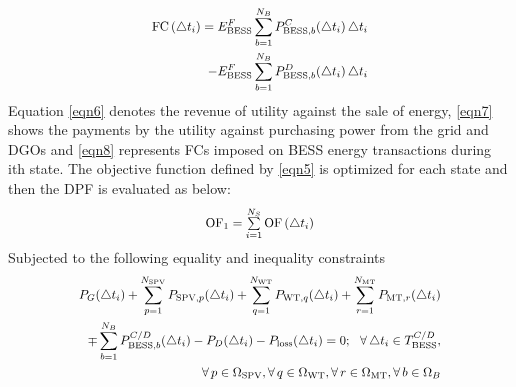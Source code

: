 \documentclass[journal]{IEEEtran}
\newcommand*\Laplace{\mathop{}\!\mathbin\bigtriangleup}
\begin{document}
    \begin{equation}
        \scalebox{0.9}[0.9]{$
    \begin{split}
 \text{FC}\left( \Laplace {{t}_{i}} \right)= E_{\text{BESS}}^{F}\sum\limits_{b=1}^{{{N}_{B}}}{P_{\text{BESS},b}^{C}(\Laplace {{t}_{i}})\Laplace {{t}_{i}}}\\
 -E_{\text{BESS}}^{F} \sum\limits_{b=1}^{{{N}_{B}}}{P_{\text{BESS},b}^{D}(\Laplace {{t}_{i}})\Laplace {{t}_{i}}} 
    \end{split}
    $}
    \label{eqn8}
    \end{equation}
    Equation \eqref{eqn6} denotes the revenue of utility against the sale of energy, \eqref{eqn7} shows the payments by the utility against purchasing power from the grid and DGOs and \eqref{eqn8} represents FCs imposed on BESS energy transactions during ith state. The objective function defined by \eqref{eqn5} is optimized for each state and then the DPF is evaluated as below: 
    \begin{equation}
        \scalebox{0.9}[0.9]{$
    \text{O{F}}_{1}=\sum\limits_{i=1}^{{{N}_{S}}}{\text{OF}\left( \Laplace {{t}_{i}} \right)}
    $}
    \label{eqn9}
    \end{equation}
    Subjected to the following equality and inequality constraints 
    \begin{equation}
\scalebox{0.9}[0.9]{$
    \begin{split}
{{P}_{G}}(\Laplace {{t}_{i}})+\sum\limits_{p=1}^{{{N}_{\text{SPV}}}}{{{P}_{\text{SPV},p}}(\Laplace {{t}_{i}})}+\sum\limits_{q=1}^{{{N}_{\text{WT}}}}{{{P}_{\text{WT},q}}(\Laplace {{t}_{i}})}
+\sum\limits_{r=1}^{{{N}_{\text{MT}}}}{{{P}_{\text{MT},r}}(\Laplace {{t}_{i}})}\\
\mp \sum\limits_{b=1}^{{{N}_{B}}}{P_{{\text{BESS}},b}^{C/D}(\Laplace {{t}_{i}})}
-{{P}_{D}}(\Laplace {{t}_{i}})-{{P}_{\text{loss}}}(\Laplace {{t}_{i}}) =0;
~~\forall \Laplace {{t}_{i}}\in T_{\text{BESS}}^{C/D},\\ 
\forall \,p\in {{\Omega }_{\text{SPV}}},\forall \,q\in {{\Omega}_{\text{WT}}},\forall \,r\in {{\Omega }_{\text{MT}}},\forall \,b\in {{\Omega }_{B}}
    \end{split}
    $}
    \label{eqn10}
    \end{equation}
\end{document}
